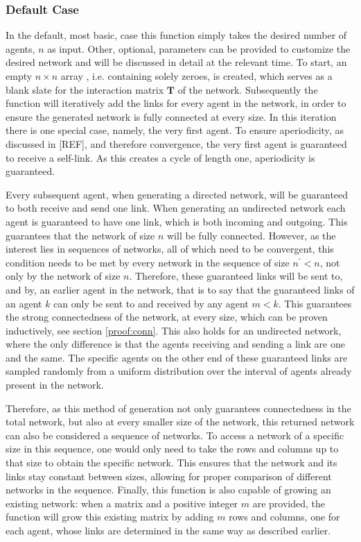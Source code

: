 \documentclass{article}
\newcommand{\T}{\textbf{T}}
\begin{document}
\subsubsection{Default Case}
In the default, most basic, case this function simply takes the desired number of agents, $n$ as input. Other, optional, parameters can be provided to customize the desired network and will be discussed in detail at the relevant time.
To start, an empty $n\times n$ array \cite{2020NumPy-Array}, i.e. containing solely zeroes, is created, which serves as a blank slate for the interaction matrix $\T$ of the network.
Subsequently the function will iteratively add the links for every agent in the network, in order to ensure the generated network is fully connected at every size. \newline
In this iteration there is one special case, namely, the very first agent. To ensure aperiodicity, as discussed in [REF], and therefore convergence, the very first agent is guaranteed to receive a self-link. As this creates a cycle of length one, aperiodicity is guaranteed. \newline

Every subsequent agent, when generating a directed network, will be guaranteed to both receive and send one link. When generating an undirected network each agent is guaranteed to have one link, which is both incoming and outgoing. This guarantees that the network of size $n$ will be fully connected. However, as the interest lies in sequences of networks, all of which need to be convergent, this condition needs to be met by every network in the sequence of size $n^{\prime} < n$, not only by the network of size $n$. Therefore, these guaranteed links will be sent to, and by, an earlier agent in the network, that is to say that the guaranteed links of an agent $k$ can only be sent to and received by any agent $m < k$. This guarantees the strong connectedness of the network, at every size, which can be proven inductively, see section \ref{proof:conn}. This also holds for an undirected network, where the only difference is that the agents receiving and sending a link are one and the same. The specific agents on the other end of these guaranteed links are sampled randomly from a uniform distribution over the interval of agents already present in the network. \newline

Therefore, as this method of generation not only guarantees connectedness in the total network, but also at every smaller size of the network, this returned network can also be considered a sequence of networks. To access a network of a specific size in this sequence, one would only need to take the rows and columns up to that size to obtain the specific network. This ensures that the network and its links stay constant between sizes, allowing for proper comparison of different networks in the sequence. Finally, this function is also capable of growing an existing network: when a matrix and a positive integer $m$ are provided, the function will grow this existing matrix by adding $m$ rows and columns, one for each agent, whose links are determined in the same way as described earlier.\newline
\end{document}
